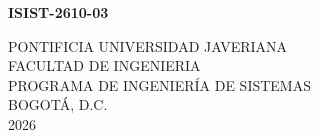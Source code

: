 \begin{titlepage}
    \begin{center}
        \vspace*{1cm}

        \Huge
        \textbf{ISIST-2610-03}

        \vspace{1cm}

        \Huge
        \thetitle

        \vspace{2.5cm}

        \Large
        \theauthor

        \vfill

        \large
        PONTIFICIA UNIVERSIDAD JAVERIANA \\
        \vspace{0.5cm}
        FACULTAD DE INGENIERIA \\
        \vspace{0.5cm}
        PROGRAMA DE INGENIERÍA DE SISTEMAS \\
        \vspace{0.5cm}
        BOGOTÁ, D.C. \\
        \vspace{0.5cm}
        2026

    \end{center}
\end{titlepage}
